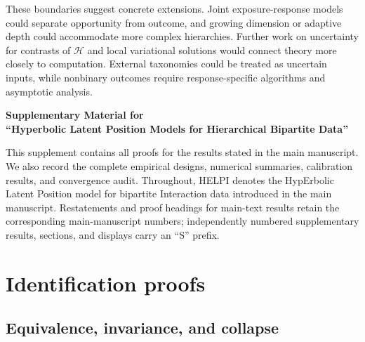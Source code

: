 \documentclass[
  12pt]{article}
\theoremstyle{definition}
\theoremstyle{plain}
\begin{document}
These boundaries suggest concrete extensions. Joint exposure-response models could separate opportunity from outcome, and growing dimension or adaptive depth could accommodate more complex hierarchies. Further work on uncertainty for contrasts of $\mathcal H$ and local variational solutions would connect theory more closely to computation. External taxonomies could be treated as uncertain inputs, while nonbinary outcomes require response-specific algorithms and asymptotic analysis.




\clearpage
{}
\label{supplementary-material}

\setcounter{section}{0}
\setcounter{figure}{0}
\setcounter{table}{0}
\setcounter{equation}{0}
\renewcommand{\thesection}{S\arabic{section}}
\renewcommand{\thefigure}{S\arabic{figure}}
\renewcommand{\thetable}{S\arabic{table}}
\renewcommand{\theequation}{S\arabic{equation}}
\renewcommand{\theHsection}{supp.section.\arabic{section}}
\renewcommand{\theHfigure}{supp.figure.\arabic{figure}}
\renewcommand{\theHtable}{supp.table.\arabic{table}}
\renewcommand{\theHequation}{supp.equation.\arabic{equation}}

\begin{center}
{\LARGE\bf Supplementary Material for}\\[0.6em]
{\Large\bf \textquotedblleft Hyperbolic Latent Position Models for Hierarchical Bipartite Data\textquotedblright}
\end{center}
\bigskip

This supplement contains all proofs for the results stated in the main manuscript. We also record the complete empirical designs, numerical summaries, calibration results, and convergence audit. Throughout, HELPI denotes the HypErbolic Latent Position model for bipartite Interaction data introduced in the main manuscript. Restatements and proof headings for main-text results retain the corresponding main-manuscript numbers; independently numbered supplementary results, sections, and displays carry an ``S'' prefix.


\section{Identification proofs}

\subsection{Equivalence, invariance, and collapse}
\end{document}
